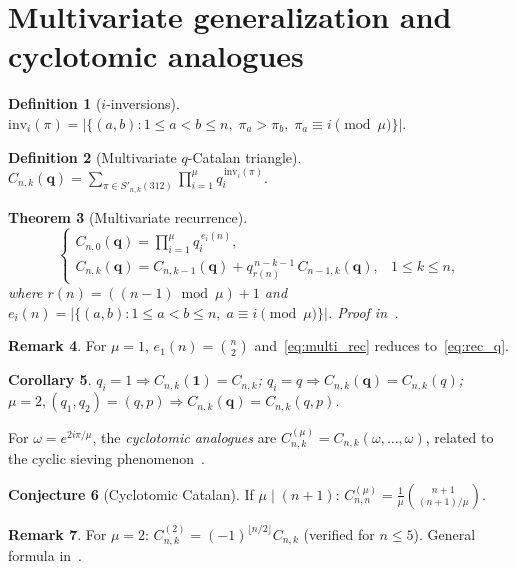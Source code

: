 \documentclass[12pt,a4paper,reqno]{amsart}
\theoremstyle{plain}
\newtheorem{theorem}{Theorem}[section]
\newtheorem{corollary}[theorem]{Corollary}
\theoremstyle{definition}
\newtheorem{definition}[theorem]{Definition}
\newtheorem{remark}[theorem]{Remark}
\newtheorem{conjecture}[theorem]{Conjecture}
\newcommand{\Snkp}[1]{S'_{n,k}(#1)}
\newcommand{\bq}{\mathbf{q}}
\begin{document}
\section{Multivariate generalization and cyclotomic analogues}\label{sec:multi}
\begin{definition}[$i$-inversions]\label{def:invi}
$\mathrm{inv}_i(\pi)=|\{(a,b):1\le a<b\le n,\;\pi_a>\pi_b,\;
\pi_a\equiv i\pmod{\mu}\}|$.
\end{definition}
\begin{definition}[Multivariate $q$-Catalan triangle]\label{def:multi}
$C_{n,k}(\bq)=\sum_{\pi\in\Snkp{312}}\prod_{i=1}^{\mu}q_i^{\,\mathrm{inv}_i(\pi)}$.
\end{definition}
\begin{theorem}[Multivariate recurrence]\label{thm:multi_rec}
\begin{equation}\label{eq:multi_rec}
\begin{cases}
C_{n,0}(\bq)=\prod_{i=1}^{\mu}q_i^{\,e_i(n)},\\[6pt]
C_{n,k}(\bq)=C_{n,k-1}(\bq)+q_{r(n)}^{\,n-k-1}\,C_{n-1,k}(\bq), & 1\le k\le n,
\end{cases}
\end{equation}
where $r(n)=((n-1)\bmod\mu)+1$ and
$e_i(n)=|\{(a,b):1\le a<b\le n,\;a\equiv i\pmod\mu\}|$.
Proof in~\cite{W5}.
\end{theorem}
\begin{remark}\label{rem:mu1}
For $\mu=1$, $e_1(n)=\binom{n}{2}$ and~\eqref{eq:multi_rec} reduces to~\eqref{eq:rec_q}.
\end{remark}
\begin{corollary}\label{cor:spec_multi}
$q_i=1\Rightarrow C_{n,k}(\mathbf{1})=C_{n,k}$;\quad
$q_i=q\Rightarrow C_{n,k}(\bq)=C_{n,k}(q)$;\quad
$\mu=2,(q_1,q_2)=(q,p)\Rightarrow C_{n,k}(\bq)=C_{n,k}(q,p)$.
\end{corollary}
For $\omega=e^{2i\pi/\mu}$, the \emph{cyclotomic analogues} are
$C_{n,k}^{(\mu)}=C_{n,k}(\omega,\ldots,\omega)$,
related to the cyclic sieving phenomenon~\cite{RSW}.
\begin{conjecture}[Cyclotomic Catalan]\label{conj:cyclo}
If $\mu\mid(n+1)$: $C_{n,n}^{(\mu)}=\frac{1}{\mu}\binom{n+1}{(n+1)/\mu}$.
\end{conjecture}
\begin{remark}\label{rem:cyclo_tri}
For $\mu=2$: $C_{n,k}^{(2)}=(-1)^{\lfloor n/2\rfloor}C_{n,k}$ (verified for $n\le5$).
General formula in~\cite{W5}.
\end{remark}
\end{document}

